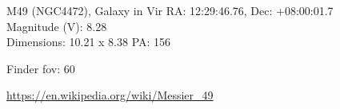 \begin{block}{M49 (NGC4472), Galaxy in Vir}
    RA: 12:29:46.76, Dec: +08:00:01.7 \\ 
    Magnitude (V): 8.28 \\ 
    Dimensions: 10.21 x 8.38 PA: 156 

    Finder fov: 60 

    \url{https://en.wikipedia.org/wiki/Messier_49} 
\end{block}
